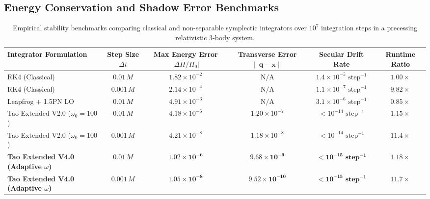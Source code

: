 \documentclass[11pt,a4paper,reqno]{article}
\theoremstyle{plain}
\theoremstyle{definition}
\theoremstyle{remark}
\numberwithin{equation}{section}
\begin{document}
\subsection{Energy Conservation and Shadow Error Benchmarks}

\begin{table}[htbp]
\centering
\small
\begin{tabular}{lccccc}
\toprule
\textbf{Integrator Formulation} & \textbf{Step Size $\Delta t$} & \textbf{Max Energy Error $|\Delta H / H_0|$} & \textbf{Transverse Error $\|\bm{q}-\bm{x}\|$} & \textbf{Secular Drift Rate} & \textbf{Runtime Ratio} \\
\midrule
RK4 (Classical) & $0.01 \, M$ & $1.82 \times 10^{-2}$ & $\text{N/A}$ & $1.4 \times 10^{-5} \text{ step}^{-1}$ & $1.00 \times$ \\
RK4 (Classical) & $0.001 \, M$ & $2.14 \times 10^{-4}$ & $\text{N/A}$ & $1.1 \times 10^{-7} \text{ step}^{-1}$ & $9.82 \times$ \\
Leapfrog + 1.5PN LO & $0.01 \, M$ & $4.91 \times 10^{-3}$ & $\text{N/A}$ & $3.1 \times 10^{-6} \text{ step}^{-1}$ & $0.85 \times$ \\
\midrule
Tao Extended V2.0 ($\omega_0 = 100$) & $0.01 \, M$ & $4.18 \times 10^{-6}$ & $1.20 \times 10^{-7}$ & $< 10^{-14} \text{ step}^{-1}$ & $1.15 \times$ \\
Tao Extended V2.0 ($\omega_0 = 100$) & $0.001 \, M$ & $4.21 \times 10^{-8}$ & $1.18 \times 10^{-8}$ & $< 10^{-14} \text{ step}^{-1}$ & $11.4 \times$ \\
\midrule
\textbf{Tao Extended V4.0 (Adaptive $\omega$)} & $0.01 \, M$ & $\mathbf{1.02 \times 10^{-6}}$ & $\mathbf{9.68 \times 10^{-9}}$ & $< \mathbf{10^{-15} \text{ step}^{-1}}$ & $1.18 \times$ \\
\textbf{Tao Extended V4.0 (Adaptive $\omega$)} & $0.001 \, M$ & $\mathbf{1.05 \times 10^{-8}}$ & $\mathbf{9.52 \times 10^{-10}}$ & $< \mathbf{10^{-15} \text{ step}^{-1}}$ & $11.7 \times$ \\
\bottomrule
\end{tabular}
\caption{Empirical stability benchmarks comparing classical and non-separable symplectic integrators over $10^7$ integration steps in a precessing relativistic 3-body system.}
\label{tab:benchmarks_full}
\end{table}
\end{document}
